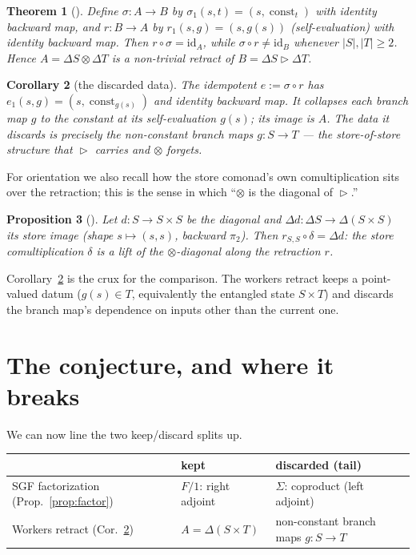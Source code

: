 \documentclass[11pt]{amsart}
\theoremstyle{plain}
\newtheorem{theorem}{Theorem}[section]
\newtheorem{proposition}[theorem]{Proposition}
\newtheorem{corollary}[theorem]{Corollary}
\theoremstyle{definition}
\theoremstyle{gap}
\renewcommand{\lhd}{\vartriangleright}
\newcommand{\Store}[1]{\Delta #1}
\DeclareMathOperator{\const}{const}
\begin{document}
\begin{theorem}[{\cite[Thm.~1.1]{workersProof}}]\label{thm:retract}
Define $\sigma\colon A\to B$ by $\sigma_1(s,t)=(s,\const_t)$ with identity backward
map, and $r\colon B\to A$ by $r_1(s,g)=(s,g(s))$ (\emph{self-evaluation}) with
identity backward map. Then $r\circ\sigma=\mathrm{id}_A$, while
$\sigma\circ r\ne\mathrm{id}_B$ whenever $|S|,|T|\ge 2$. Hence
$A=\Store{S}\otimes\Store{T}$ is a non-trivial retract of $B=\Store{S}\lhd\Store{T}$.
\end{theorem}

\begin{corollary}[the discarded data]\label{cor:idem}
The idempotent $e:=\sigma\circ r$ has $e_1(s,g)=(s,\const_{g(s)})$ and identity
backward map. It collapses each branch map $g$ to the constant at its self-evaluation
$g(s)$; its image is $A$. The data it discards is precisely the non-constant branch
maps $g\colon S\to T$ --- the store-of-store structure that $\lhd$ carries and
$\otimes$ forgets.
\end{corollary}

For orientation we also recall how the store comonad's own comultiplication sits over
the retraction; this is the sense in which ``$\otimes$ is the diagonal of $\lhd$.''

\begin{proposition}[{\cite[Thm.~3.1]{workersProof}}]\label{prop:diag}
Let $d\colon S\to S\times S$ be the diagonal and $\Store{d}\colon\Store{S}\to
\Store{(S\times S)}$ its store image (shape $s\mapsto(s,s)$, backward $\pi_2$). Then
$r_{S,S}\circ\delta=\Store{d}$: the store comultiplication $\delta$ is a lift of the
$\otimes$-diagonal along the retraction $r$.
\end{proposition}

Corollary~\ref{cor:idem} is the crux for the comparison. The workers retract keeps a
point-valued datum ($g(s)\in T$, equivalently the entangled state $S\times T$) and
discards the branch map's dependence on inputs other than the current one.

\section{The conjecture, and where it breaks}\label{sec:conj}

We can now line the two keep/discard splits up.

\begin{center}
\begin{tabular}{lll}
\hline
 & \textbf{kept} & \textbf{discarded (tail)}\\
\hline
SGF factorization (Prop.~\ref{prop:factor}) & $F/1$: right adjoint & $\Sigma$: coproduct (left adjoint)\\
Workers retract (Cor.~\ref{cor:idem}) & $A=\Store{(S\times T)}$ & non-constant branch maps $g\colon S\to T$\\
\hline
\end{tabular}
\end{center}
\end{document}
